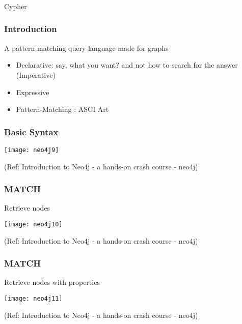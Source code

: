 \begin{frame}[fragile]\frametitle{}
\begin{center}
{\Large Cypher}
\end{center}
\end{frame}


\begin{frame}[fragile]\frametitle{Introduction}
A pattern matching query language made for graphs

\begin{itemize}
\item Declarative: say, what you want? and not how to search for the answer (Imperative)
\item Expressive
\item Pattern-Matching : ASCI Art
\end{itemize}

\end{frame}


\begin{frame}[fragile]\frametitle{Basic Syntax}

\begin{center}
\texttt{[image: neo4j9]}
\end{center}	  


{\tiny (Ref: Introduction to Neo4j - a hands-on crash course  - neo4j)}

\end{frame}


\begin{frame}[fragile]\frametitle{MATCH}

Retrieve nodes

\begin{center}
\texttt{[image: neo4j10]}
\end{center}	  


{\tiny (Ref: Introduction to Neo4j - a hands-on crash course  - neo4j)}

\end{frame}

\begin{frame}[fragile]\frametitle{MATCH}

Retrieve nodes with properties

\begin{center}
\texttt{[image: neo4j11]}
\end{center}	  


{\tiny (Ref: Introduction to Neo4j - a hands-on crash course  - neo4j)}

\end{frame}

